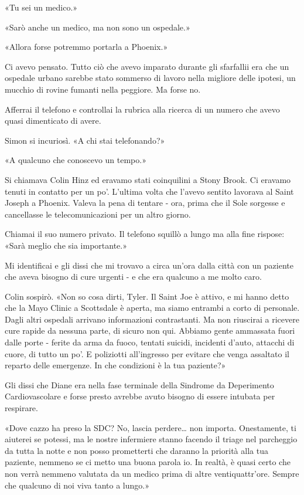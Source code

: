 «Tu sei un medico.»

«Sarò anche un medico, ma non sono un ospedale.»

«Allora forse potremmo portarla a Phoenix.»

Ci avevo pensato. Tutto ciò che avevo imparato durante gli sfarfallii
era che un ospedale urbano sarebbe stato sommerso di lavoro nella
migliore delle ipotesi, un mucchio di rovine fumanti nella peggiore. Ma
forse no.

Afferrai il telefono e controllai la rubrica alla ricerca di un numero
che avevo quasi dimenticato di avere.

Simon si incuriosì. «A chi stai telefonando?»

«A qualcuno che conoscevo un tempo.»

Si chiamava Colin Hinz ed eravamo stati coinquilini a Stony Brook. Ci
eravamo tenuti in contatto per un po'. L'ultima volta che l'avevo
sentito lavorava al Saint Joseph a Phoenix. Valeva la pena di tentare -
ora, prima che il Sole sorgesse e cancellasse le telecomunicazioni per
un altro giorno.

Chiamai il suo numero privato. Il telefono squillò a lungo ma alla fine
rispose: «Sarà meglio che sia importante.»

Mi identificai e gli dissi che mi trovavo a circa un'ora dalla città con
un paziente che aveva bisogno di cure urgenti - e che era qualcuno a me
molto caro.

Colin sospirò. «Non so cosa dirti, Tyler. Il Saint Joe è attivo, e mi
hanno detto che la Mayo Clinic a Scottsdale è aperta, ma siamo entrambi
a corto di personale. Dagli altri ospedali arrivano informazioni
contrastanti. Ma non riuscirai a ricevere cure rapide da nessuna parte,
di sicuro non qui. Abbiamo gente ammassata fuori dalle porte - ferite da
arma da fuoco, tentati suicidi, incidenti d'auto, attacchi di cuore, di
tutto un po'. E poliziotti all'ingresso per evitare che venga assaltato
il reparto delle emergenze. In che condizioni è la tua paziente?»

Gli dissi che Diane era nella fase terminale della Sindrome da
Deperimento Cardiovascolare e forse presto avrebbe avuto bisogno di
essere intubata per respirare.

«Dove cazzo ha preso la SDC? No, lascia perdere\ldots{} non importa.
Onestamente, ti aiuterei se potessi, ma le nostre infermiere stanno
facendo il triage nel parcheggio da tutta la notte e non posso
prometterti che daranno la priorità alla tua paziente, nemmeno se ci
metto una buona parola io. In realtà, è quasi certo che non verrà
nemmeno valutata da un medico prima di altre ventiquattr'ore. Sempre che
qualcuno di noi viva tanto a lungo.»

